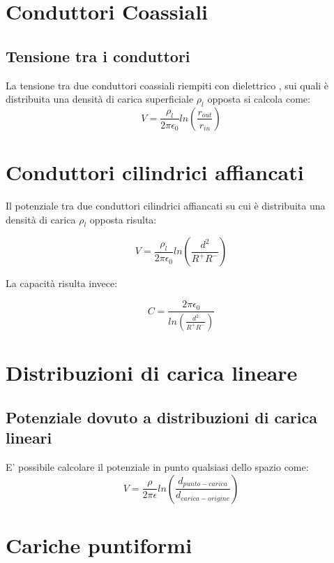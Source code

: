 \documentclass[10pt,a4paper]{report}
\begin{document}
	\section{Conduttori Coassiali}
		\subsection{Tensione tra i conduttori}

		La tensione tra due conduttori coassiali riempiti con dielettrico , sui quali è distribuita una densità di carica superficiale $\rho_l$ opposta si calcola come:
		 \begin{equation}
		 V= \frac {\rho_l}  {2 \pi \epsilon_0} ln ( \frac { r_{out} } { r_{in} } )
		 \end{equation}
	
	\section{Conduttori cilindrici affiancati}

		Il potenziale tra due conduttori cilindrici affiancati su cui è distribuita una densità di carica $\rho_l$ opposta risulta:

		\begin{equation}
		V=\frac{\rho_l}{2 \pi \epsilon_0}{ln(\frac{d^2}{R^+R^-})}
		\label{eq:potenzialebifilari}
		\end{equation}

		La capacità risulta invece:

		\begin{equation}
		C=\frac{2 \pi \epsilon_0}{ln(\frac{d^2}{R^+R^-})}
		\end{equation}

	\section{Distribuzioni di carica lineare}

		\subsection{Potenziale dovuto a distribuzioni di carica lineari}
		E' possibile calcolare il potenziale in punto qualsiasi dello spazio come: 
		\[
		V=\frac{\rho}{2\pi \epsilon}ln(\frac{d_{punto-carica}}{d_{carica-origine}})
		\]

	\section{Cariche puntiformi}
\end{document}
